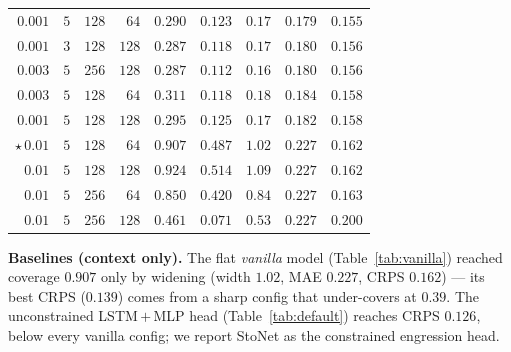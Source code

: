 \documentclass[11pt]{article}
\begin{document}
\begin{table}[H]
\begin{tabular}{rrrr ccccc}
    $0.001$ & $5$ & $128$ & $64$ & $0.290$ & $0.123$ & $0.17$ & $0.179$ & $0.155$ \\
    $0.001$ & $3$ & $128$ & $128$ & $0.287$ & $0.118$ & $0.17$ & $0.180$ & $0.156$ \\
    $0.003$ & $5$ & $256$ & $128$ & $0.287$ & $0.112$ & $0.16$ & $0.180$ & $0.156$ \\
    $0.003$ & $5$ & $128$ & $64$ & $0.311$ & $0.118$ & $0.18$ & $0.184$ & $0.158$ \\
    $0.001$ & $5$ & $128$ & $128$ & $0.295$ & $0.125$ & $0.17$ & $0.182$ & $0.158$ \\
    $\star$\,$0.01$ & $5$ & $128$ & $64$ & $0.907$ & $0.487$ & $1.02$ & $0.227$ & $0.162$ \\
    $0.01$ & $5$ & $128$ & $128$ & $0.924$ & $0.514$ & $1.09$ & $0.227$ & $0.162$ \\
    $0.01$ & $5$ & $256$ & $64$ & $0.850$ & $0.420$ & $0.84$ & $0.227$ & $0.163$ \\
    $0.01$ & $5$ & $256$ & $128$ & $0.461$ & $0.071$ & $0.53$ & $0.227$ & $0.200$ \\
    \bottomrule
  \end{tabular}
\end{table}

\noindent
\textbf{Baselines (context only).} The flat \emph{vanilla} model (Table~\ref{tab:vanilla})
reached coverage $0.907$ only by widening (width $1.02$, MAE $0.227$, CRPS $0.162$) ---
its best CRPS ($0.139$) comes from a sharp config that under-covers at $0.39$. The
unconstrained LSTM\,$+$\,MLP head (Table~\ref{tab:default}) reaches CRPS $0.126$, below
every vanilla config; we report StoNet as the constrained engression head.
\end{document}
